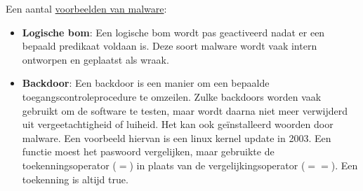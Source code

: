 \documentclass{report}
\begin{document}
	Een aantal \underline{voorbeelden van malware}:
	\begin{itemize}
		\item \textbf{Logische bom}: Een logische bom wordt pas geactiveerd nadat er een bepaald predikaat voldaan is. Deze soort malware wordt vaak intern ontworpen en geplaatst als wraak.
		\item \textbf{Backdoor}: Een backdoor is een manier om een bepaalde toegangscontroleprocedure te omzeilen. Zulke backdoors worden vaak gebruikt om de software te testen, maar wordt daarna niet meer verwijderd uit vergeetachtigheid of luiheid. Het kan ook geïnstalleerd woorden door malware. Een voorbeeld hiervan is een linux kernel update in 2003. Een functie moest het paswoord vergelijken, maar gebruikte de toekenningsoperator ($=$)  in plaats van de vergelijkingsoperator ($==$). Een toekenning is altijd true.
		

\end{itemize}
\end{document}
